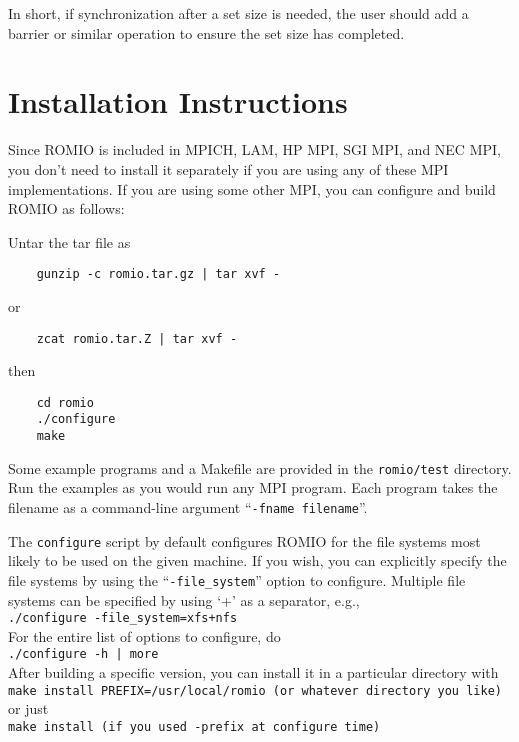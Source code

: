 In short, if synchronization after a set size is needed, the user should add a
barrier or similar operation to ensure the set size has completed.


%
%
\section{Installation Instructions}
Since ROMIO is included in MPICH, LAM, HP MPI, SGI MPI, and NEC MPI, you don't
need to install it separately if you are using any of these MPI
implementations. If you are using some other MPI, you
can configure and build ROMIO as follows: 

Untar the tar file as
\begin{verbatim}
    gunzip -c romio.tar.gz | tar xvf -
\end{verbatim}
{\noindent or}
\begin{verbatim}
    zcat romio.tar.Z | tar xvf -
\end{verbatim}

{\noindent then}

\begin{verbatim}
    cd romio
    ./configure
    make
\end{verbatim}

Some example programs and a Makefile are provided in the {\tt romio/test}
directory.  Run the examples as you would run any MPI program. Each
program takes the filename as a command-line argument ``{\tt -fname
filename}''.

The {\tt configure} script by default configures ROMIO for the file
systems most likely 
to be used on the given machine. If you wish, you can explicitly specify the file
systems by using the ``{\tt -file\_system}'' option to configure. Multiple file
systems can be specified by using `+' as a separator, e.g., \\
\hspace*{.4in} {\tt ./configure -file\_system=xfs+nfs} \\
For the entire list of options to configure, do\\ 
\hspace*{.4in} {\tt ./configure -h | more} \\
After building a specific version, you can install it in a
particular directory with \\
\hspace*{.4in} {\tt make install PREFIX=/usr/local/romio    (or whatever directory you like)} \\
or just\\
\hspace*{.4in} {\tt make install          (if you used -prefix at configure time)}

